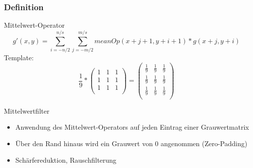 \documentclass[aspectratio=169]{beamer}
\begin{document}
\begin{frame}
    \frametitle{Definition}
    \begin{center}
    \begin{alertblock}
        {Mittelwert-Operator}
        \begin{equation}
            g'(x,y)=\sum_{i=-n/2}^{n/s}\sum_{j=-m/2}^{m/s}meanOp(x+j+1,y+i+1)*g(x+j,y+i)
        \end{equation}
        Template:
        \begin{equation}
            \frac{1}{9} *
            \begin{pmatrix}
                1 & 1 & 1 \\
                1 & 1 & 1 \\
                1 & 1 & 1 \\
            \end{pmatrix}
            =
            \begin{pmatrix}
                \frac{1}{9} & \frac{1}{9} & \frac{1}{9} \\
                \frac{1}{9} & \frac{1}{9} & \frac{1}{9} \\
                \frac{1}{9} & \frac{1}{9} & \frac{1}{9} \\
            \end{pmatrix}
        \end{equation}
    \end{alertblock}
    \begin{alertblock}
        {Mittelwertfilter}
        \begin{itemize}
            \item Anwendung des Mittelwert-Operators auf jeden Eintrag einer Grauwertmatrix
            \item Über den Rand hinaus wird ein Grauwert von 0 angenommen (Zero-Padding)
            \item Schärfereduktion, Rauschfilterung
        \end{itemize}
    \end{alertblock}
    \end{center}
\end{frame}
\end{document}
